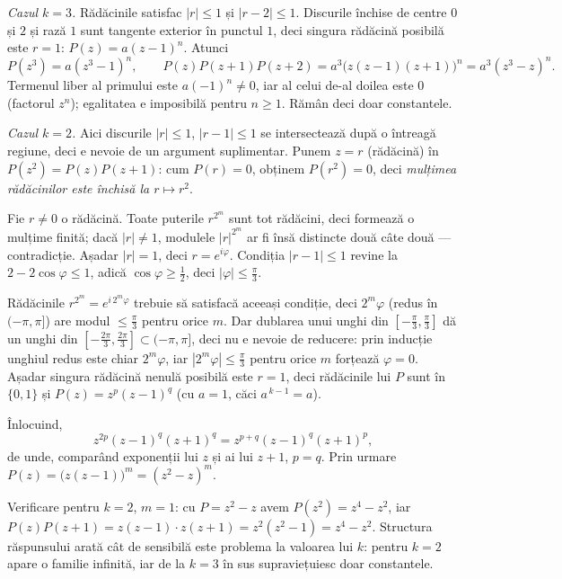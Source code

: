 \begin{solutie}
\smallskip
\textit{Cazul $k=3$.} Rădăcinile satisfac $|r|\le 1$ și
$|r-2|\le 1$. Discurile închise de centre $0$ și $2$ și rază
$1$ sunt tangente exterior în punctul $1$, deci singura rădăcină
posibilă este $r=1$: $P(z)=a(z-1)^{n}$. Atunci
\[
  P(z^{3})=a(z^{3}-1)^{n}, \qquad
  P(z)P(z{+}1)P(z{+}2)=a^{3}\bigl(z(z-1)(z+1)\bigr)^{n}=a^{3}(z^{3}-z)^{n}.
\]
Termenul liber al primului este $a(-1)^{n}\neq 0$, iar al celui de-al doilea
este $0$ (factorul $z^{n}$); egalitatea e imposibilă pentru $n\ge1$.
Rămân deci doar constantele.

\smallskip
\textit{Cazul $k=2$.} Aici discurile $|r|\le 1$, $|r-1|\le 1$ se
intersectează după o întreagă regiune, deci e nevoie de un
argument suplimentar. Punem $z=r$ (rădăcină) în
$P(z^{2})=P(z)P(z+1)$: cum $P(r)=0$, obținem $P(r^{2})=0$, deci
\emph{mulțimea rădăcinilor este închisă la $r\mapsto r^{2}$}.

Fie $r\neq 0$ o rădăcină. Toate puterile $r^{2^{m}}$ sunt tot
rădăcini, deci formează o mulțime finită; dacă
$|r|\neq 1$, modulele $|r|^{2^{m}}$ ar fi însă distincte două
câte două --- contradicție. Așadar $|r|=1$, deci
$r=e^{i\varphi}$. Condiția $|r-1|\le 1$ revine la
$2-2\cos\varphi\le 1$, adică $\cos\varphi\ge \tfrac12$, deci
$|\varphi|\le \tfrac{\pi}{3}$.

Rădăcinile $r^{2^{m}}=e^{i\,2^{m}\varphi}$ trebuie să
satisfacă aceeași condiție, deci $2^{m}\varphi$ (redus în
$(-\pi,\pi]$) are modul $\le \tfrac{\pi}{3}$ pentru orice $m$. Dar dublarea
unui unghi din $[-\tfrac{\pi}{3},\tfrac{\pi}{3}]$ dă un unghi din
$[-\tfrac{2\pi}{3},\tfrac{2\pi}{3}]\subset(-\pi,\pi]$, deci nu e nevoie de
reducere: prin inducție unghiul redus este chiar $2^{m}\varphi$, iar
$|2^{m}\varphi|\le\tfrac{\pi}{3}$ pentru orice $m$ forțează
$\varphi=0$. Așadar singura rădăcină nenulă posibilă
este $r=1$, deci rădăcinile lui $P$ sunt în $\{0,1\}$ și
$P(z)=z^{p}(z-1)^{q}$ (cu $a=1$, căci $a^{\,k-1}=a$).

Înlocuind,
\[
  z^{2p}(z-1)^{q}(z+1)^{q}=z^{p+q}(z-1)^{q}(z+1)^{p},
\]
de unde, comparând exponenții lui $z$ și ai lui $z+1$,
$p=q$. Prin urmare $P(z)=\bigl(z(z-1)\bigr)^{m}=(z^{2}-z)^{m}$.
\end{solutie}

\begin{obs}
Verificare pentru $k=2$, $m=1$: cu $P=z^{2}-z$ avem $P(z^{2})=z^{4}-z^{2}$,
iar $P(z)P(z+1)=z(z-1)\cdot z(z+1)=z^{2}(z^{2}-1)=z^{4}-z^{2}$. Structura
răspunsului arată cât de sensibilă este problema la valoarea
lui $k$: pentru $k=2$ apare o familie infinită, iar de la $k=3$ în
sus supraviețuiesc doar constantele.
\end{obs}

